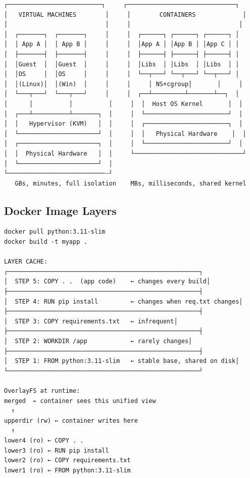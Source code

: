 \documentclass[11pt]{article}
\begin{document}
\setcodelang{}

\begin{verbatim}
┌──────────────────────────┐     ┌──────────────────────────────┐
│   VIRTUAL MACHINES        │     │        CONTAINERS             │
│                           │     │                              │
│  ┌───────┐  ┌───────┐     │     │  ┌──────┐ ┌──────┐ ┌──────┐ │
│  │ App A │  │ App B │     │     │  │App A │ │App B │ │App C │ │
│  ├───────┤  ├───────┤     │     │  ├──────┤ ├──────┤ ├──────┤ │
│  │Guest  │  │Guest  │     │     │  │Libs  │ │Libs  │ │Libs  │ │
│  │OS     │  │OS     │     │     │  └──┬───┘ └──┬───┘ └──┬───┘ │
│  │(Linux)│  │(Win)  │     │     │     │ NS+cgroup│       │     │
│  └───┬───┘  └───┬───┘     │     │  ┌──┴─────────┴───────┴──┐  │
│      │          │          │     │  │  Host OS Kernel       │  │
│  ┌───┴──────────┴───────┐  │     │  └───────────────────────┘  │
│  │   Hypervisor (KVM)   │  │     │  ┌───────────────────────┐  │
│  └──────────────────────┘  │     │  │   Physical Hardware    │  │
│  ┌──────────────────────┐  │     │  └───────────────────────┘  │
│  │  Physical Hardware   │  │     └──────────────────────────────┘
│  └──────────────────────┘  │
└───────────────────────────-┘
   GBs, minutes, full isolation    MBs, milliseconds, shared kernel
\end{verbatim}

\subsection{Docker Image Layers}\label{docker-image-layers}

\setcodelang{}

\begin{verbatim}
docker pull python:3.11-slim
docker build -t myapp .

LAYER CACHE:
┌─────────────────────────────────────────────────────┐
│  STEP 5: COPY . .  (app code)    ← changes every build│
├─────────────────────────────────────────────────────┤
│  STEP 4: RUN pip install         ← changes when req.txt changes│
├─────────────────────────────────────────────────────┤
│  STEP 3: COPY requirements.txt   ← infrequent│
├─────────────────────────────────────────────────────┤
│  STEP 2: WORKDIR /app            ← rarely changes│
├─────────────────────────────────────────────────────┤
│  STEP 1: FROM python:3.11-slim   ← stable base, shared on disk│
└─────────────────────────────────────────────────────┘

OverlayFS at runtime:
merged  ← container sees this unified view
  ↑
upperdir (rw) ← container writes here
  ↑
lower4 (ro) ← COPY . .
lower3 (ro) ← RUN pip install
lower2 (ro) ← COPY requirements.txt
lower1 (ro) ← FROM python:3.11-slim
\end{verbatim}
\end{document}
